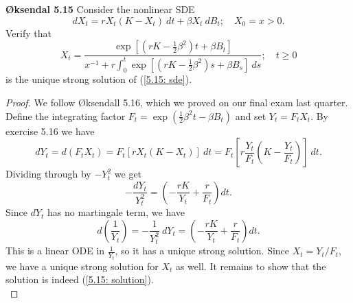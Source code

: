 \documentclass[11pt,letterpaper]{report}
\begin{document}
\noindent\textbf{\O ksendal 5.15}
Consider the nonlinear SDE
\begin{equation}\label{5.15: sde}
	dX_t = rX_t(K-X_t)\ dt + \beta X_t\ dB_t;\quad X_0 = x>0.
\end{equation}
Verify that
\begin{equation}\label{5.15: solution}
	X_t = \frac{\exp[(rK-\frac{1}{2}\beta^2)t + \beta B_t]}{x^{-1} + r\int_0^t\exp[(rK-\frac{1}{2}\beta^2)s + \beta B_s]\ ds};\quad t\geq 0
\end{equation}
is the unique strong solution of (\ref{5.15: sde}).
\begin{proof}


	We follow \O ksendall 5.16, which we proved on our final exam last quarter. Define the integrating factor $F_t = \exp(\frac{1}{2}\beta^2t - \beta B_t)$ and set $Y_t = F_tX_t$. By exercise 5.16 we have
	\[
	dY_t = d(F_tX_t) = F_t[rX_t(K-X_t)]\ dt = F_t\left[r\frac{Y_t}{F_t}\left(K - \frac{Y_t}{F_t}\right) \right]\ dt.
	\]
	Dividing through by $-Y_t^2$ we get
	\[
	-\frac{dY_t}{Y_t^2} = \left(-\frac{rK}{Y_t} + \frac{r}{F_t} \right)dt.
	\]
	Since $dY_t$ has no martingale term, we have
	\[
	d\left(\frac{1}{Y_t}\right) = -\frac{1}{Y_t^2}\ dY_t = \left(-\frac{rK}{Y_t} + \frac{r}{F_t} \right)dt.
	\]
	This is a linear ODE in $\frac{1}{Y_t}$, so it has a unique strong solution. Since $X_t = Y_t/F_t$, we have a unique strong solution for $X_t$ as well. It remains to show that the solution is indeed (\ref{5.15: solution}).\\


\end{proof}
\end{document}
